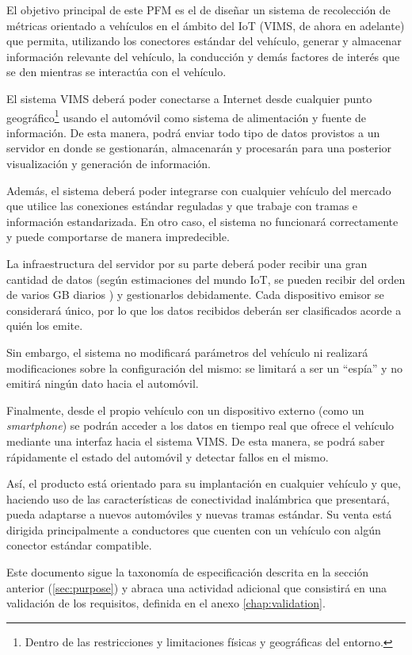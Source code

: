 El objetivo principal de este \ac{PFM} es el de diseñar un sistema de recolección
de métricas orientado a vehículos en el ámbito del \ac{IoT} (\ac{VIMS}, de ahora en adelante)
que permita, utilizando los conectores estándar del vehículo, generar y almacenar
información relevante del vehículo, la conducción y demás factores de interés que
se den mientras se interactúa con el vehículo.

El sistema \ac{VIMS} deberá poder conectarse a Internet desde cualquier punto
geográfico\footnote{Dentro de las restricciones y limitaciones físicas y 
geográficas del entorno.} usando el automóvil como sistema de alimentación y
fuente de información. De esta manera, podrá enviar todo tipo de datos provistos 
a un servidor en donde se gestionarán, almacenarán y procesarán para 
una posterior visualización y generación de información.

Además, el sistema deberá poder integrarse con cualquier vehículo del mercado que
utilice las conexiones estándar reguladas y que trabaje con tramas e información
estandarizada. En otro caso, el sistema no funcionará correctamente y puede
comportarse de manera impredecible.

La infraestructura del servidor por su parte deberá poder recibir una gran cantidad
de datos (según estimaciones del mundo \ac{IoT}, se pueden recibir del orden de
varios \ac{GB} diarios \cite{vishHowMuchData2020}) y gestionarlos debidamente.
Cada dispositivo emisor se considerará único, por lo que los datos recibidos
deberán ser clasificados acorde a quién los emite.

Sin embargo, el sistema no modificará parámetros del vehículo ni realizará
modificaciones sobre la configuración del mismo: se limitará a ser un ``espía''
y no emitirá ningún dato hacia el automóvil.

Finalmente, desde el propio vehículo con un dispositivo externo (como un
\textit{smartphone}) se podrán acceder a los datos en tiempo real que ofrece el
vehículo mediante una interfaz hacia el sistema \ac{VIMS}. De esta manera, se
podrá saber rápidamente el estado del automóvil y detectar fallos en el mismo.

Así, el producto está orientado para su implantación en cualquier vehículo y que,
haciendo uso de las características de conectividad inalámbrica que presentará, pueda
adaptarse a nuevos automóviles y nuevas tramas estándar. Su venta está dirigida
principalmente a conductores que cuenten con un vehículo con algún conector estándar
compatible.

Este documento sigue la taxonomía de especificación descrita en la sección anterior (\ref{sec:purpose})
y abraca una actividad adicional que consistirá en una validación de los requisitos,
definida en el anexo \ref{chap:validation}.